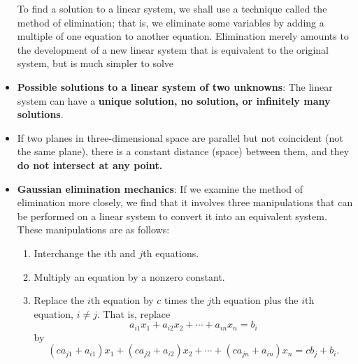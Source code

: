 \documentclass{report}
\begin{document}
\begin{itemize}
            To find a solution to a linear system, we shall use a technique called the
method of elimination; that is, we eliminate some variables by adding a multiple
of one equation to another equation. Elimination merely amounts to the development of a new linear system that is equivalent to the original system, but is much
simpler to solve
        \item \textbf{Possible solutions to a linear system of two unknowns}: The linear system can have a \textbf{unique solution, no solution, or infinitely many solutions}.
            \bigbreak \noindent 
            \bigbreak \noindent 
        \item  If two planes in three-dimensional space are parallel but not coincident (not the same plane), there is a constant distance (space) between them, and they \textbf{do not intersect at any point.}
        \item \textbf{Gaussian elimination mechanics}:
            \noindent If we examine the method of elimination more closely, we find that it involves three manipulations that can be performed on a linear system to convert it into an equivalent system. These manipulations are as follows:
            \begin{enumerate}
                \item Interchange the \(i\)th and \(j\)th equations.
                \item Multiply an equation by a nonzero constant.
                \item Replace the \(i\)th equation by \(c\) times the \(j\)th equation plus the \(i\)th equation, \(i \neq j\). That is, replace
                    \[
                        a_{i1}x_1 + a_{i2}x_2 + \cdots + a_{in}x_n = b_i
                    \]
                    by
                    \[
                        (ca_{j1} + a_{i1})x_1 + (ca_{j2} + a_{i2})x_2 + \cdots + (ca_{jn} + a_{in})x_n = cb_j + b_i.
                    \]
            \end{enumerate}
    \end{itemize}

    \pagebreak 
\end{document}
